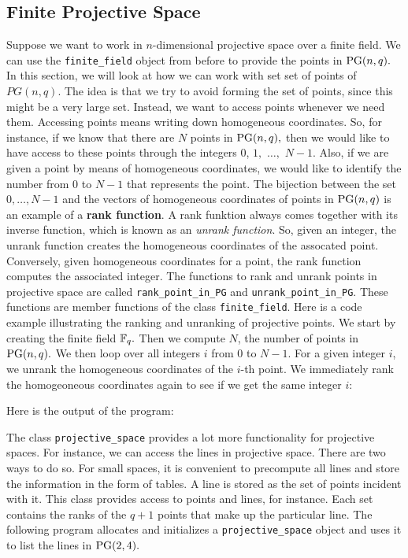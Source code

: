 \subsection{Finite Projective Space}


Suppose we want to work in $n$-dimensional projective space over a finite field. We can use the 
\verb'finite_field' object from before to provide the points in ${\rm PG}(n,q).$ 
In this section, we will look at how we can work with set set of points of $PG(n,q).$ 
The idea is that we try to avoid forming the set of points, since this might be a very large set. 
Instead, we want to access points whenever we need them. Accessing points means writing down homogeneous coordinates.
So, for instance, if we know that 
there are $N$ points in ${\rm PG}(n,q),$ then we would like to have access to these points 
through the integers $0$, $1,$ $\ldots,$ $N-1$. 
Also, if we are given a point by means of homogeneous coordinates, we would like to 
identify the number from $0$ to $N-1$ that represents the point. 
The bijection between the set $0,\ldots,N-1$ and the vectors of homogeneous coordinates 
of points in ${\rm PG}(n,q)$ is an example of a {\bf rank function}. A rank funktion always comes together with 
its inverse function, which is known as an {\em unrank function}. 
So, given an integer, the unrank function creates the homogeneous coordinates of the assocated point. 
Conversely, given homogeneous coordinates for a point, the rank function computes the associated integer. 
The functions to rank and unrank  points in projective space are called 
\verb'rank_point_in_PG' and \verb'unrank_point_in_PG'. 
These functions  are member functions of the class \verb'finite_field'.
Here is  a code example illustrating the ranking and unranking of projective points. 
We start by creating the finite field ${\mathbb F}_q.$ 
Then we compute $N$, the number of points in ${\rm PG}(n,q).$
We then loop over all integers $i$ from $0$ to $N-1$. For a given integer $i$, 
we unrank the homogeneous coordinates of the $i$-th point. 
We immediately rank the homogeoneous coordinates again to see if we get the same integer $i$:


{\tt

}

Here is the output of the program:


{\tt

}

The class \verb'projective_space' provides 
a lot more functionality for projective spaces.
For instance, we can access the lines in projective space.
There are two ways to do so. 
For small spaces, it is convenient to precompute all lines and store the information in the form of tables. 
A line is stored as the set of points incident with it. 
This class provides access to points and lines, for instance. 
Each set contains the ranks of the $q+1$ points that make up the particular line.
The following program 
allocates and initializes a  \verb'projective_space' object 
and uses it to list the lines in ${\rm PG}(2,4).$ 

